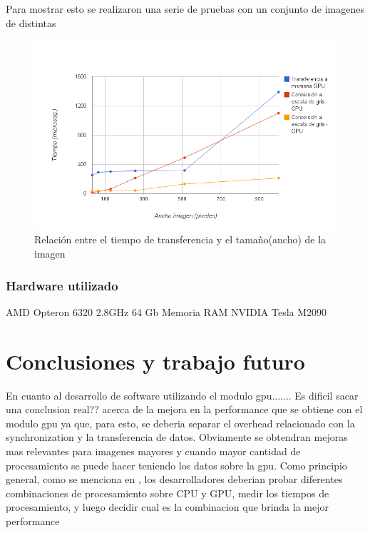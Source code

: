 \documentclass[a4paper,10pt]{report}
\begin{document}
Para mostrar esto se realizaron una serie de pruebas con un conjunto de imagenes de distintas 

% 


\begin{figure}
  \centering
    \includegraphics[width=1.0\textwidth]{img/sizeVstime.png}
  \caption{Relación entre el tiempo de transferencia y el tamaño(ancho) de la imagen}
  \label{sizevstime}
\end{figure}


\subsection{Hardware utilizado}


AMD Opteron 6320  2.8GHz 
64 Gb Memoria RAM
NVIDIA Tesla M2090 

\chapter{Conclusiones y trabajo futuro}



En cuanto al desarrollo de software utilizando el modulo gpu.......
Es dificil sacar una conclusion   real??  acerca de la mejora en la performance que se obtiene con el modulo gpu ya que, para esto, se deberia separar el overhead relacionado con la synchronization y la transferencia de datos.
Obviamente se obtendran mejoras mas relevantes para imagenes mayores y cuando mayor cantidad de procesamiento se puede hacer teniendo los datos sobre la gpu.
Como principio general, como se menciona en  \cite{pulli2012real}  , los desarrolladores deberian probar diferentes combinaciones de procesamiento sobre CPU y GPU, medir los tiempos de procesamiento, y luego decidir cual es la combinacion que brinda la mejor performance
\end{document}
